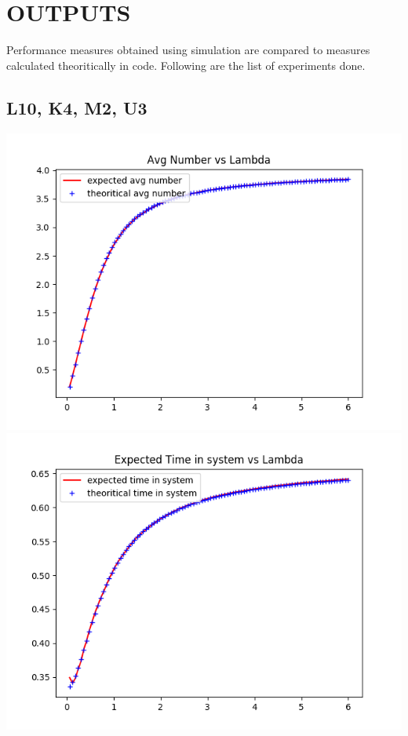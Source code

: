 \documentclass[11pt]{article}
\begin{document}
 \section{OUTPUTS}
 Performance measures obtained using simulation are compared to measures calculated theoritically in code. Following are the list of experiments done.
 
 \subsection{L10, K4, M2, U3}
 \includegraphics{ExpectedNumber_L10_K4_M2_U3}
  \includegraphics{ExpectedTime_L10_K4_M2_U3}
\end{document}
